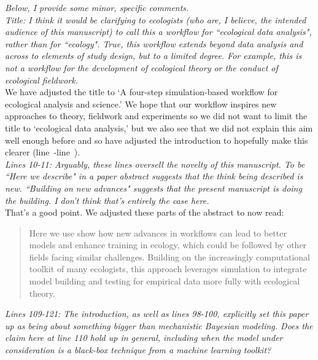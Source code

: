 \documentclass[11pt,a4paper]{article}
\newcommand{\lr}[1]{line~\lineref{#1}}
\begin{document}
\emph{Below, I provide some minor, specific comments.}\\


\emph{Title: I think it would be clarifying to ecologists (who are, I believe, the intended audience of this manuscript) to call this a workflow for ``ecological data analysis", rather than for ``ecology". True, this workflow extends beyond data analysis and across to elements of study design, but to a limited degree. For example, this is not a workflow for the development of ecological theory or the conduct of ecological fieldwork.}\\

We have adjusted the title to `A four-step simulation-based workflow for ecological analysis and science.' We hope that our workflow inspires new approaches to theory, fieldwork and experiments so we did not want to limit the title to `ecological data analysis,' but we also see that we did not explain this aim well enough before and so have adjusted the introduction to hopefully make this clearer (\lr{newintrostart}-\lr{newintroend}). \\


\emph{Lines 10-11: Arguably, these lines oversell the novelty of this manuscript. To be ``Here we describe" in a paper abstract suggests that the think being described is new. ``Building on new advances" suggests that the present manuscript is doing the building. I don't think that's entirely the case here.}\\

That's a good point. We adjusted these parts of the abstract to now read:
\begin{quote}
Here we use show how new advances in workflows can lead to better models and enhance training in ecology, which could be followed by other fields facing similar challenges. Building on the increasingly computational toolkit of many ecologists, this approach leverages simulation to integrate model building and testing for empirical data more fully with ecological theory.
\end{quote}


\emph{Lines 109-121: The introduction, as well as lines 98-100, explicitly set this paper up as being about something bigger than mechanistic Bayesian modeling. Does the claim here at line 110 hold up in general, including when the model under consideration is a black-box technique from a machine learning toolkit?}\\
\end{document}
